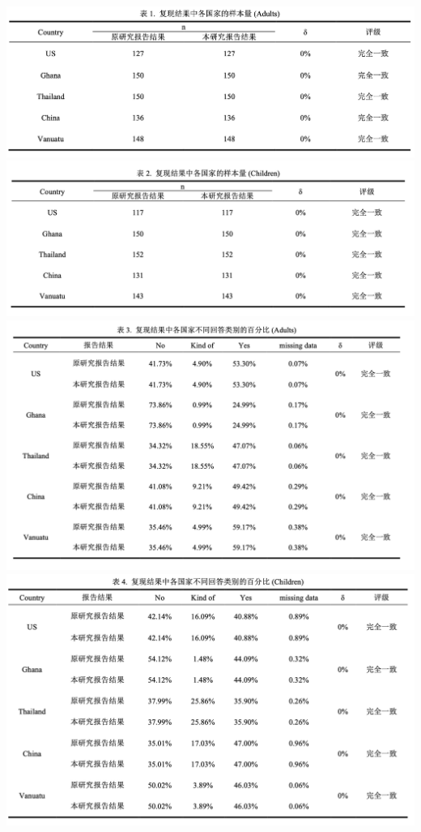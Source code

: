 \documentclass[
  man]{apa6}
\begin{document}
\includegraphics{./Script_Re_Weisman_2021_Group1_2024_files/Repeatability_figures/table1.png}
\includegraphics{./Script_Re_Weisman_2021_Group1_2024_files/Repeatability_figures/table2.png}
\includegraphics{./Script_Re_Weisman_2021_Group1_2024_files/Repeatability_figures/table3.png}
\includegraphics{./Script_Re_Weisman_2021_Group1_2024_files/Repeatability_figures/table4.png}
\end{document}
